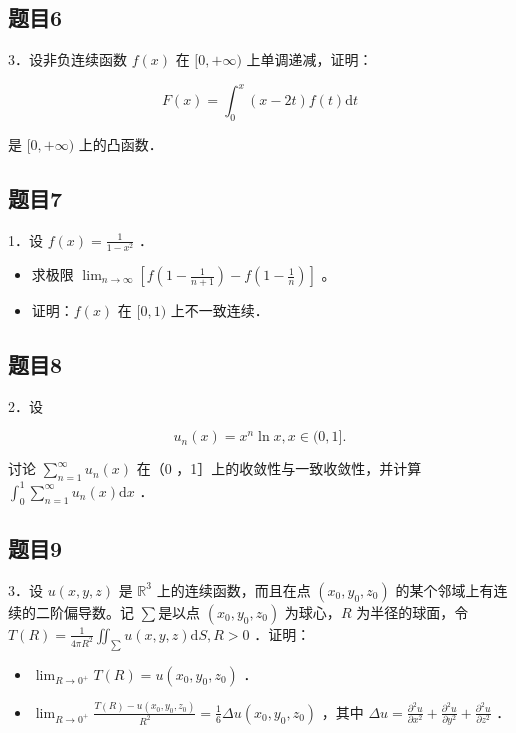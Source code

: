 \documentclass{article}
\begin{document}
\subsection{题目6}
3．设非负连续函数 \(f(x)\) 在 \([0,+\infty)\) 上单调递减，证明：

\[
F(x)=\int_{0}^{x}(x-2 t) f(t) \mathrm{d} t
\]

是 \([0,+\infty)\) 上的凸函数．

\subsection{题目7}
1．设 \(f(x)=\frac{1}{1-x^{2}}\) ．

\begin{itemize}
  \item[（1）] 求极限 \(\lim _{n \rightarrow \infty}\left[f\left(1-\frac{1}{n+1}\right)-f\left(1-\frac{1}{n}\right)\right]\) 。
  \item[（2）] 证明：\(f(x)\) 在 \([0,1)\) 上不一致连续．
\end{itemize}

\subsection{题目8}
2．设

\[
u_{n}(x)=x^{n} \ln x, x \in(0,1] .
\]

讨论 \(\sum_{n=1}^{\infty} u_{n}(x)\) 在（0 ，1］上的收敛性与一致收敛性，并计算 \(\int_{0}^{1} \sum_{n=1}^{\infty} u_{n}(x) \mathrm{d} x\) ．

\subsection{题目9}
3．设 \(u(x, y, z)\) 是 \(\mathbb{R}^{3}\) 上的连续函数，而且在点 \(\left(x_{0}, y_{0}, z_{0}\right)\) 的某个邻域上有连续的二阶偏导数。记 \(\sum\)是以点 \(\left(x_{0}, y_{0}, z_{0}\right)\) 为球心，\(R\) 为半径的球面，令 \(T(R)=\frac{1}{4 \pi R^{2}} \iint_{\sum} u(x, y, z) \mathrm{d} S, R>0\) ．证明：

\begin{itemize}
  \item[（1）] \(\lim _{R \rightarrow 0^{+}} T(R)=u\left(x_{0}, y_{0}, z_{0}\right)\) ．
  \item[（2）] \(\lim _{R \rightarrow 0^{+}} \frac{T(R)-u\left(x_{0}, y_{0}, z_{0}\right)}{R^{2}}=\frac{1}{6} \Delta u\left(x_{0}, y_{0}, z_{0}\right)\) ，其中 \(\Delta u=\frac{\partial^{2} u}{\partial x^{2}}+\frac{\partial^{2} u}{\partial y^{2}}+\frac{\partial^{2} u}{\partial z^{2}}\) ．
\end{itemize}
\end{document}
